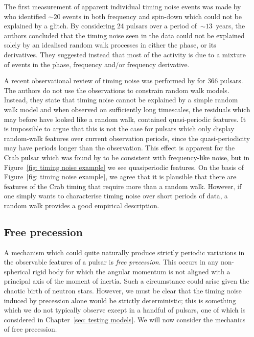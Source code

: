 The first measurement of apparent individual timing noise events was made by
\citet{Cordes1985} who identified $\sim20$ events in both frequency and
spin-down which could not be explained by a glitch. By considering 24 pulsars
over a period of~$\sim13$~years, the authors concluded that the timing noise
seen in the data could not be explained solely by an idealised random walk
processes in either the phase, or its derivatives. They suggested instead that
most of the activity is due to a mixture of events in the phase, frequency
and/or frequency derivative.

A recent observational review of timing noise was performed by
\citet{Hobbs2010} for 366 pulsars. The authors do not use the observations to
constrain random walk models. Instead, they state that timing noise cannot be
explained by a simple random walk model and when observed on sufficiently long
timescales, the residuals which may before have looked like a random walk,
contained quasi-periodic features. It is impossible to argue that this is not
the case for pulsars which only display random-walk features over current
observation periods, since the quasi-periodicity may have periods longer than
the observation. This effect is apparent for the Crab pulsar which was found by
\citet{Boynton1972} to be consistent with frequency-like noise, but in
Figure~\ref{fig: timing noise example} we see quasiperiodic features. On the
basis of Figure~\ref{fig: timing noise example}, we agree that it is plausible
that there are features of the Crab timing that require more than a random
walk.  However, if one simply wants to characterise timing noise over short
periods of data, a random walk provides a good empirical description.

\subsection{Free precession}
\label{sec: free precession}

A mechanism which could quite naturally produce strictly periodic variations in
the observable features of a pulsar is \emph{free precession}. This occurs in
any non-spherical rigid body for which the angular momentum is not aligned with a
principal axis of the moment of inertia. Such a circumstance could arise given
the chaotic birth of neutron stars. However, we must be clear that the timing noise
induced by precession alone would be strictly deterministic; this is something
which we do not typically observe except in a handful of pulsars, one of which
is considered in Chapter~\ref{sec: testing models}. We will now
consider the mechanics of free precession.

